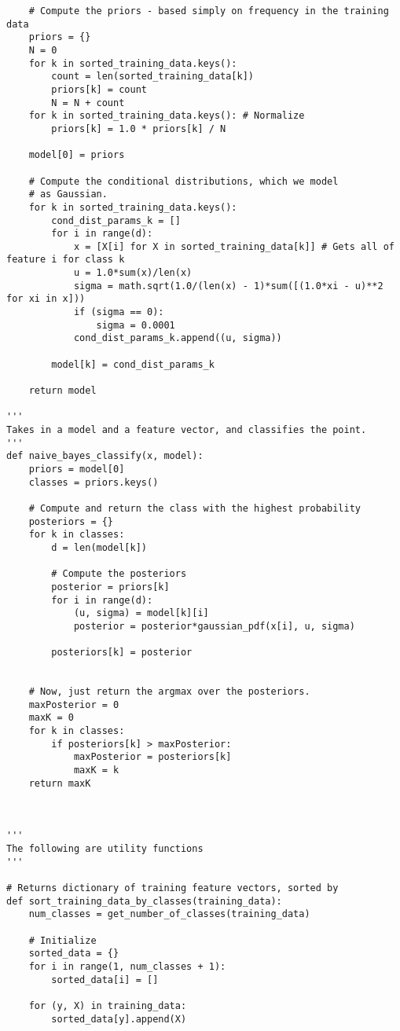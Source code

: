 \documentclass[aps,twocolumn,secnumarabic,balancelastpage,amsmath,amssymb,nofootinbib]{revtex4-1}
\begin{document}
\begin{widetext}
\begin{verbatim}
    # Compute the priors - based simply on frequency in the training data
    priors = {}
    N = 0
    for k in sorted_training_data.keys():
        count = len(sorted_training_data[k])
        priors[k] = count
        N = N + count
    for k in sorted_training_data.keys(): # Normalize
        priors[k] = 1.0 * priors[k] / N

    model[0] = priors

    # Compute the conditional distributions, which we model
    # as Gaussian.
    for k in sorted_training_data.keys():
        cond_dist_params_k = []
        for i in range(d):
            x = [X[i] for X in sorted_training_data[k]] # Gets all of feature i for class k
            u = 1.0*sum(x)/len(x)
            sigma = math.sqrt(1.0/(len(x) - 1)*sum([(1.0*xi - u)**2 for xi in x]))
            if (sigma == 0):
                sigma = 0.0001
            cond_dist_params_k.append((u, sigma))

        model[k] = cond_dist_params_k

    return model

'''
Takes in a model and a feature vector, and classifies the point.
'''
def naive_bayes_classify(x, model):
    priors = model[0]
    classes = priors.keys()

    # Compute and return the class with the highest probability
    posteriors = {}
    for k in classes:
        d = len(model[k])
        
        # Compute the posteriors
        posterior = priors[k]
        for i in range(d):
            (u, sigma) = model[k][i]
            posterior = posterior*gaussian_pdf(x[i], u, sigma)

        posteriors[k] = posterior


    # Now, just return the argmax over the posteriors.
    maxPosterior = 0
    maxK = 0
    for k in classes:
        if posteriors[k] > maxPosterior:
            maxPosterior = posteriors[k]
            maxK = k
    return maxK



'''
The following are utility functions
'''

# Returns dictionary of training feature vectors, sorted by
def sort_training_data_by_classes(training_data):
    num_classes = get_number_of_classes(training_data)

    # Initialize
    sorted_data = {}
    for i in range(1, num_classes + 1):
        sorted_data[i] = []
    
    for (y, X) in training_data:
        sorted_data[y].append(X)


\end{verbatim}
\end{widetext}
\end{document}
